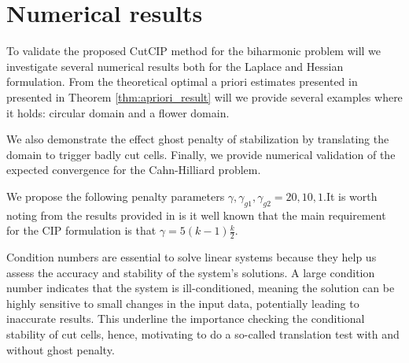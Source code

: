 
\newpage
\section{Numerical results}%
\label{sec:numerical_results}


To validate the proposed CutCIP method for the biharmonic problem will we investigate several numerical results both for the Laplace and Hessian formulation. From the theoretical optimal a priori estimates presented in presented in Theorem \ref{thm:apriori_result} will we provide several
examples where it holds: circular domain and a flower domain.



%     

We also demonstrate the effect ghost penalty of stabilization by translating the domain to trigger badly cut cells. Finally, we provide numerical validation of the expected convergence for
the Cahn-Hilliard problem.

We propose the following penalty parameters $\gamma , \gamma _{g1}, \gamma _{g2} = 20,10, 1$.It is worth noting from the results provided in \cite{brenner2012, brenner2012quadratic_kirk,
brenner2012quadratic} is it well known that the main requirement for the CIP formulation is that $\gamma = 5( k -1)\frac{k}{2}$.

Condition numbers are essential to solve linear systems because they help us assess the accuracy and stability of the system's solutions. A large condition number indicates that the system is ill-conditioned, meaning the solution can be highly
sensitive to small changes in the input data, potentially leading to inaccurate results. This underline the importance checking the conditional stability of cut cells, hence, motivating to do a so-called translation test with and without ghost
penalty.


